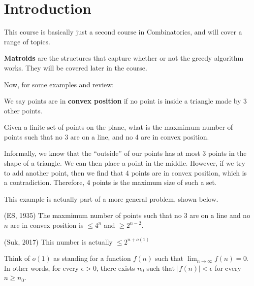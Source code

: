 
\section{Introduction}

This course is basically just a second course in Combinatorics, and will cover a range of topics.

\begin{definition}
	\textbf{Matroids} are the structures that capture whether or not the greedy algorithm works. They will be covered later in the course.
\end{definition}

Now, for some examples and review:

\begin{definition}
	We say points are in \textbf{convex position} if no point is inside a triangle made by 3 other points.
\end{definition}

\begin{eg}
	Given a finite set of points on the plane, what is the maxmimum number of points such that no 3 are on a line, and no 4 are in convex position.
\end{eg}
\begin{explanation}
	Informally, we know that the ``outside'' of our points has at most 3 points in the shape of a triangle. We can then place a point in the middle. However, if we try to add another point, then we find that 4 points are in convex position, which is a contradiction. Therefore, 4 points is the maximum size of such a set.
\end{explanation}

This example is actually part of a more general problem, shown below.

\begin{theorem}
	(ES, 1935) The maxmimum number of points such that no 3 are on a line and no \( n \) are in convex position is \( \le 4^n \) and \( \ge 2^{n-2}  \).
\end{theorem}

\begin{theorem}
	(Suk, 2017) This number is actually \( \le 2^{n + o(1)}  \)
\end{theorem}

\begin{notation}
	Think of \( o(1) \) as standing for a function \( f(n) \) such that \( \lim_{n \to \infty} f(n) = 0 \). In other words, for every \( \epsilon >0 \), there exists \( n_0 \) such that \( |f(n)| < \epsilon  \) for every \( n\ge n_0 \).
\end{notation}

